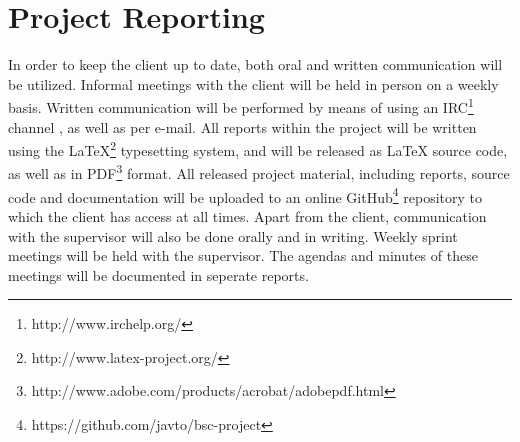 \section{Project Reporting}
In order to keep the client up to date, both oral and written communication will be utilized. Informal meetings with the client will be held in person on a weekly basis. Written communication will be performed by means of using an IRC\footnote{http://www.irchelp.org/} channel , as well as per e-mail. All reports within the project will be written using the LaTeX\footnote{http://www.latex-project.org/} typesetting system, and will be released as LaTeX source code, as well as in PDF\footnote{http://www.adobe.com/products/acrobat/adobepdf.html} format. All released project material, including reports, source code and documentation will be uploaded to an online GitHub\footnote{https://github.com/javto/bsc-project} repository to which the client has access at all times. Apart from the client, communication with the supervisor will also be done orally and in writing. Weekly sprint meetings will be held with the supervisor. The agendas and minutes of these meetings will be documented in seperate reports.